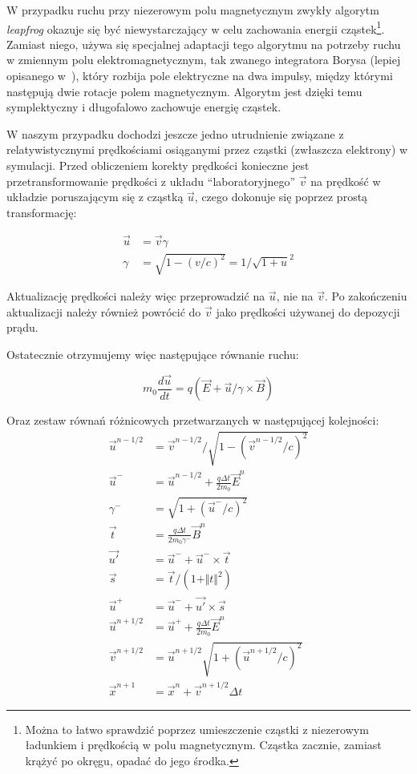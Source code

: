 W przypadku ruchu przy niezerowym polu magnetycznym zwykły algorytm
\emph{leapfrog} okazuje się być niewystarczający w celu zachowania energii
cząstek\footnote{Można to łatwo sprawdzić poprzez umieszczenie cząstki z
niezerowym ładunkiem i prędkością w polu magnetycznym. Cząstka zacznie, zamiast
krążyć po okręgu, opadać do jego środka.}.  Zamiast niego, używa
się specjalnej adaptacji tego algorytmu na potrzeby ruchu w zmiennym polu
elektromagnetycznym, tak zwanego integratora Borysa (lepiej opisanego
w~\cite{birdsall}), który rozbija pole elektryczne na dwa impulsy, między
którymi następują dwie rotacje polem magnetycznym. Algorytm jest dzięki temu
symplektyczny i długofalowo zachowuje energię cząstek.

W naszym przypadku dochodzi jeszcze jedno utrudnienie związane z
relatywistycznymi prędkościami osiąganymi przez cząstki (zwłaszcza
elektrony) w symulacji. Przed obliczeniem korekty prędkości konieczne jest
przetransformowanie prędkości z układu ``laboratoryjnego'' $\vec{v}$ na
prędkość w układzie poruszającym się z cząstką $\vec{u}$, czego dokonuje
się poprzez prostą transformację:

\begin{align}
    \vec{u} &= \vec{v} \gamma \\
    \gamma &= \sqrt{1-{(v/c)}^2} = 1/\sqrt{1+u}^2
    \label{eqn:gamma-transformation}
\end{align}


Aktualizację prędkości należy więc przeprowadzić na $\vec{u}$, nie na
$\vec{v}$. Po zakończeniu
aktualizacji należy również powrócić do $\vec{v}$ jako prędkości używanej
do depozycji prądu.

Ostatecznie otrzymujemy więc następujące równanie ruchu:

\begin{equation}
m_0 \frac{d \vec{u}}{dt} = q \left( \vec{E} + \vec{u} / \gamma \times \vec{B} \right)
\label{eqn:relativistic-eqn-motion}
\end{equation}

Oraz zestaw równań różnicowych przetwarzanych w następującej kolejności:
\begin{align}
    \vec{u}^{n-1/2} &= \vec{v}^{n-1/2} / \sqrt{1-{(\vec{v}^{n-1/2}/c)}^2} \\
    \label{eqn:boris-pusher-start}
    \vec{u}^- &= \vec{u}^{n-1/2} + \frac{q \Delta t}{2m_0} \vec{E}^n \\
    \gamma^- &= \sqrt{1 + {\left( {\vec{u}^-} / c \right)}^2 } \\
    \vec{t} &= \frac{q \Delta t} {2 m_0 \gamma^-} \vec{B}^n \\ 
    \vec{u'} &= \vec{u}^- + \vec{u}^- \times \vec{t} \\
    \vec{s} &= \vec{t} / {(1 + \Vert t \Vert^2)} \\
    \vec{u}^+ &= \vec{u}^- + \vec{u'} \times \vec{s} \\
    \vec{u}^{n+1/2} &= \vec{u}^+ + \frac{q \Delta t}{2m_0} \vec{E}^n \\
    \vec{v}^{n+1/2} &= \vec{u}^{n+1/2} \sqrt{1+{(\vec{u}^{n+1/2}/c)}^2} \\
    \vec{x}^{n+1} &= \vec{x}^{n} + \vec{v}^{n+1/2} \Delta t
    \label{eqn:boris-pusher-end}
\end{align}


